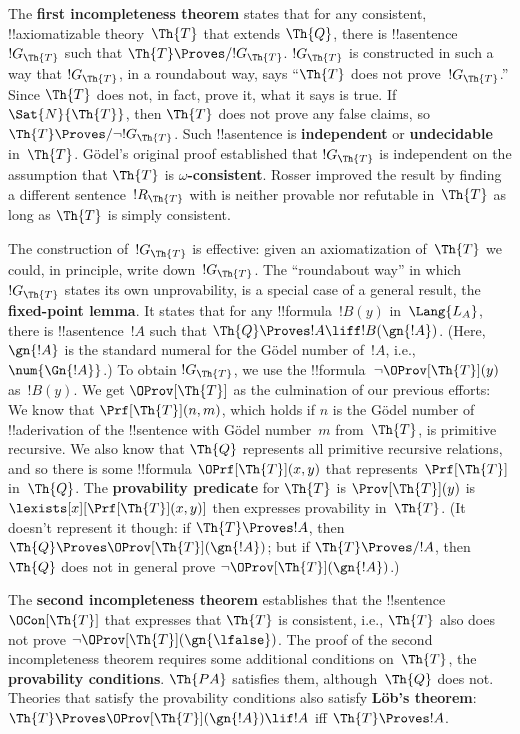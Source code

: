 The \textbf{first incompleteness theorem} states that for any
consistent, !!{axiomatizable} theory~$\Th{T}$ that extends $\Th{Q}$,
there is !!a{sentence}~$!G_\Th{T}$ such that $\Th{T} \Proves/
!G_\Th{T}$. $!G_\Th{T}$ is constructed in such a way that $!G_\Th{T}$,
in a roundabout way, says ``$\Th{T}$ does not prove~$!G_\Th{T}$.''
Since $\Th{T}$ does not, in fact, prove it, what it says is true. If
$\Sat{N}{\Th{T}}$, then $\Th{T}$ does not prove any false claims, so
$\Th{T} \Proves/ \lnot !G_\Th{T}$. Such !!a{sentence} is
\textbf{independent} or \textbf{undecidable} in~$\Th{T}$. G\"odel's
original proof established that $!G_\Th{T}$ is independent on the
assumption that $\Th{T}$ is \textbf{$\omega$-consistent}. Rosser
improved the result by finding a different sentence~$!R_\Th{T}$ with
is neither provable nor refutable in~$\Th{T}$ as long as $\Th{T}$ is
simply consistent.

The construction of~$!G_\Th{T}$ is effective: given an axiomatization
of~$\Th{T}$ we could, in principle, write down~$!G_\Th{T}$. The
``roundabout way'' in which $!G_\Th{T}$ states its own unprovability,
is a special case of a general result, the \textbf{fixed-point
  lemma}. It states that for any !!{formula}~$!B(y)$ in~$\Lang{L_A}$,
there is !!a{sentence}~$!A$ such that $\Th{Q} \Proves !A \liff
!B(\gn{!A})$. (Here, $\gn{!A}$ is the standard numeral for the G\"odel
number of~$!A$, i.e., $\num{\Gn{!A}}$.)  To obtain $!G_\Th{T}$, we use
the !!{formula}~$\lnot\OProv[\Th{T}](y)$ as~$!B(y)$.  We get
$\OProv[\Th{T}]$ as the culmination of our previous efforts: We know
that $\Prf[\Th{T}](n, m)$, which holds if $n$ is the G\"odel number of
!!a{derivation} of the !!{sentence} with G\"odel number~$m$
from~$\Th{T}$, is primitive recursive. We also know that $\Th{Q}$
represents all primitive recursive relations, and so there is some
!!{formula} $\OPrf[\Th{T}](x,y)$ that represents~$\Prf[\Th{T}]$
in~$\Th{Q}$. The \textbf{provability predicate} for $\Th{T}$ is
$\Prov[\Th{T}](y)$ is $\lexists[x][\Prf[\Th{T}](x, y)]$ then expresses
provability in~$\Th{T}$. (It doesn't represent it though: if $\Th{T}
\Proves !A$, then $\Th{Q} \Proves \OProv[\Th{T}](\gn{!A})$; but if
$\Th{T} \Proves/ !A$, then $\Th{Q}$ does not in general prove $\lnot
\OProv[\Th{T}](\gn{!A})$.)

The \textbf{second incompleteness theorem} establishes that the
!!{sentence}~$\OCon[\Th{T}]$ that expresses that $\Th{T}$ is
consistent, i.e., $\Th{T}$ also does not prove $\lnot
\OProv[\Th{T}](\gn{\lfalse})$.  The proof of the second incompleteness
theorem requires some additional conditions on~$\Th{T}$, the
\textbf{provability conditions}. $\Th{PA}$ satisfies them,
although~$\Th{Q}$ does not. Theories that satisfy the provability
conditions also satisfy \textbf{L\"ob's theorem}: $\Th{T} \Proves
\OProv[\Th{T}](\gn{!A}) \lif !A$ iff $\Th{T} \Proves !A$.

